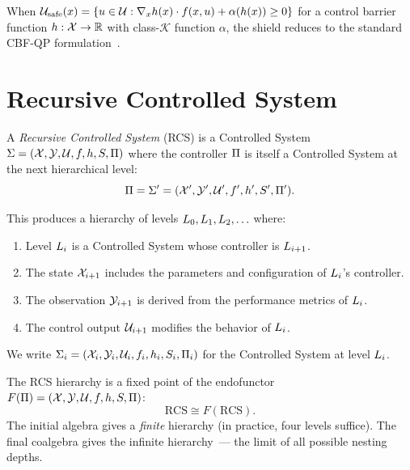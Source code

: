 \documentclass[11pt,a4paper]{article}
\begin{document}
\begin{remark}
When $\mathcal{U}_{\text{safe}}(x) = \{u \in \mathcal{U} : \nabla_x h(x) \cdot f(x, u)
+ \alpha(h(x)) \geq 0\}$ for a control barrier function $h : \mathcal{X} \to \mathbb{R}$
with class-$\mathcal{K}$ function $\alpha$, the shield reduces to the
standard CBF-QP formulation~\cite{eslami2026control}.
\end{remark}


\section{Recursive Controlled System}
\label{sec:rcs}

\begin{definition}
\label{def:rcs}
A \emph{Recursive Controlled System} (RCS) is a Controlled System
$\Sigma = (\mathcal{X}, \mathcal{Y}, \mathcal{U}, f, h, S, \Pi)$ where the controller
$\Pi$ is itself a Controlled System at the next hierarchical level:
\begin{equation}
  \Pi = \Sigma' = (\mathcal{X}', \mathcal{Y}', \mathcal{U}', f', h', S', \Pi').
\end{equation}

This produces a hierarchy of levels $L_{0}, L_{1}, L_{2}, \ldots$ where:
\begin{enumerate}
  \item Level $L_{i}$ is a Controlled System whose controller is $L_{i+1}$.
  \item The state $\mathcal{X}_{i+1}$ includes the parameters and configuration of
        $L_{i}$'s controller.
  \item The observation $\mathcal{Y}_{i+1}$ is derived from the performance metrics of
        $L_{i}$.
  \item The control output $\mathcal{U}_{i+1}$ modifies the behavior of $L_{i}$.
\end{enumerate}

We write $\Sigma_i = (\mathcal{X}_i, \mathcal{Y}_i, \mathcal{U}_i, f_i, h_i, S_i, \Pi_i)$
for the Controlled System at level $L_{i}$.
\end{definition}

\begin{remark}
The RCS hierarchy is a fixed point of the endofunctor
$F(\Pi) = (\mathcal{X}, \mathcal{Y}, \mathcal{U}, f, h, S, \Pi)$:
\begin{equation}
  \text{RCS} \cong F(\text{RCS}).
\end{equation}
The initial algebra gives a \emph{finite} hierarchy (in practice, four levels
suffice).  The final coalgebra gives the infinite hierarchy~--- the limit of
all possible nesting depths.
\end{remark}
\end{document}
